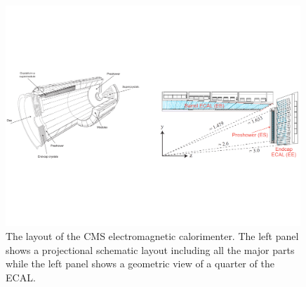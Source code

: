 \begin{figure}
 \centering
\includegraphics[width=0.99\textwidth]{CMS_DetectorFigures/ECAL_Geometry.pdf}
\caption{The layout of the CMS electromagnetic calorimenter. The left
  panel shows a projectional schematic
layout including all the major parts while the left panel shows a
geometric view of a quarter of the ECAL.\label{fig:ECALgeometry}}
\end{figure}

